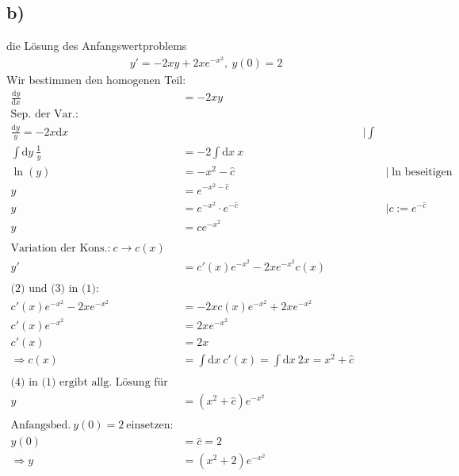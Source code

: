 \documentclass{theozettel}
\begin{document}
\subsection*{b)} die Lösung des Anfangswertproblems
\begin{align*}
y'=-2xy+2xe^{-x^2} \tag*{(1)}, \ y\left(0\right)=2
\end{align*}
Wir bestimmen den homogenen Teil:
\begin{align*}
\frac{\text{d}y}{\text{d}x}&=-2xy\\
\text{Sep. der Var.:}\\
\frac{\text{d}y}{y}=-2x\text{d}x&&|\int\\
\int\text{d}y \ \frac{1}{y}&=-2\int\text{d}x \ x\\
\ln\left(y\right)&=-x^2-\hat{c}&&|\text{$\ln$ beseitigen}\\
y&=e^{-x^2-\hat{c}}\\
y&=e^{-x^2}\cdot e^{-\hat{c}}&&|c:=e^{-\hat{c}}\\
y&=ce^{-x^2}\tag*{(2)}\\\\
\text{Variation der Kons.:} \ c\rightarrow c\left(x\right)\\
y'&=c'\left(x\right)e^{-x^2}-2xe^{-x^2}c\left(x\right)\tag*{(3)}\\\\
\text{(2) und (3) in (1):}\\
c'\left(x\right)e^{-x^2}-2xe^{-x^2}&=-2xc\left(x\right)e^{-x^2}+2xe^{-x^2}\\
c'\left(x\right)e^{-x^2}&=2xe^{-x^2}\\
c'\left(x\right)&=2x\\
\Rightarrow c\left(x\right)&=\int\text{d}x \ c'\left(x\right)=\int\text{d}x \ 2x=x^2+\hat{c}\tag*{(4)}\\\\
\text{(4) in (1) ergibt allg. Lösung für Dgl.:}\\
y&=\left(x^2+\hat{c}\right)e^{-x^2}\\\\
\text{Anfangsbed.} \ y\left(0\right)=2 \ \text{einsetzen:}\\
y\left(0\right)&=\hat{c}=2\\
\Rightarrow y&=\left(x^2+2\right)e^{-x^2}
\end{align*}
\end{document}
